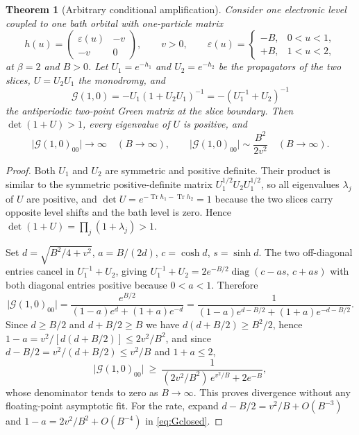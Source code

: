 \documentclass[11pt]{article}
\newtheorem{theorem}{Theorem}[section]
\theoremstyle{definition}
\theoremstyle{remark}
\DeclareMathOperator{\Tr}{Tr}
\DeclareMathOperator{\diag}{diag}
\newcommand{\Ggreen}{\mathcal{G}}
\begin{document}
\begin{theorem}[Arbitrary conditional amplification]
\label{thm:amp}
Consider one electronic level coupled to one bath orbital with one-particle matrix
\begin{equation}
h(u)=\begin{pmatrix}\varepsilon(u)&-v\\ -v&0\end{pmatrix},\qquad v>0,\qquad
\varepsilon(u)=\begin{cases}-B,&0<u<1,\\ +B,&1<u<2,\end{cases}
\label{eq:impurity}
\end{equation}
at $\beta=2$ and $B>0$. Let $U_1=e^{-h_1}$ and $U_2=e^{-h_2}$ be the propagators of
the two slices, $U=U_2U_1$ the monodromy, and
\begin{equation}
\Ggreen(1,0)=-U_1\left(1+U_2U_1\right)^{-1}
=-\left(U_1^{-1}+U_2\right)^{-1}
\label{eq:Gdef}
\end{equation}
the antiperiodic two-point Green matrix at the slice boundary. Then
$\det(1+U)>1$, every eigenvalue of $U$ is positive, and
\begin{equation}
\bigl|\Ggreen(1,0)_{00}\bigr|\longrightarrow\infty\quad(B\to\infty),\qquad
\bigl|\Ggreen(1,0)_{00}\bigr|\sim\frac{B^2}{2v^2}\quad(B\to\infty).
\label{eq:amp}
\end{equation}
\end{theorem}

\begin{proof}
Both $U_1$ and $U_2$ are symmetric and positive definite. Their product is similar to
the symmetric positive-definite matrix $U_1^{1/2}U_2U_1^{1/2}$, so all eigenvalues
$\lambda_j$ of $U$ are positive, and
$\det U=e^{-\Tr h_1-\Tr h_2}=1$ because the two slices carry opposite level shifts
and the bath level is zero. Hence $\det(1+U)=\prod_j(1+\lambda_j)>1$.

Set $d=\sqrt{B^2/4+v^2}$, $a=B/(2d)$, $c=\cosh d$, $s=\sinh d$. The two off-diagonal
entries cancel in $U_1^{-1}+U_2$, giving
$U_1^{-1}+U_2=2e^{-B/2}\diag(c-as,\,c+as)$ with both diagonal entries positive
because $0<a<1$. Therefore
\begin{equation}
\bigl|\Ggreen(1,0)_{00}\bigr|
=\frac{e^{B/2}}{(1-a)e^{d}+(1+a)e^{-d}}
=\frac{1}{(1-a)e^{d-B/2}+(1+a)e^{-d-B/2}} .
\label{eq:Gclosed}
\end{equation}
Since $d\ge B/2$ and $d+B/2\ge B$ we have $d(d+B/2)\ge B^2/2$, hence
$1-a=v^2/[d(d+B/2)]\le2v^2/B^2$, and since
$d-B/2=v^2/(d+B/2)\le v^2/B$ and $1+a\le2$,
\begin{equation}
\bigl|\Ggreen(1,0)_{00}\bigr|\ \ge\
\frac{1}{(2v^2/B^2)\,e^{v^2/B}+2e^{-B}},
\label{eq:Glower}
\end{equation}
whose denominator tends to zero as $B\to\infty$. This proves divergence without any
floating-point asymptotic fit. For the rate, expand
$d-B/2=v^2/B+O(B^{-3})$ and $1-a=2v^2/B^2+O(B^{-4})$ in \eqref{eq:Gclosed}.
\end{proof}
\end{document}
